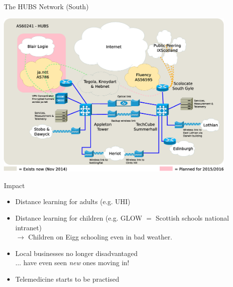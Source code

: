 \documentclass{beamer}
\begin{document}
\begin{frame}{The HUBS Network (South)}
  \begin{center}
    \includegraphics[width=0.9\textwidth]{hubs-nov2014.eps}
  \end{center}
\end{frame}
\begin{frame}{Impact}
  \begin{itemize}
    \item Distance learning for adults (e.g. UHI)
    \item Distance learning for children (e.g. GLOW $=$ Scottish
      schools national intranet)\\
      $\rightarrow$ Children on Eigg schooling even in bad weather.
    \item Local businesses no longer disadvantaged\\
      $\ldots$ have even seen \textit{new} ones moving in!
    \item Telemedicine starts to be practised
  \end{itemize}
\end{frame}
\end{document}

